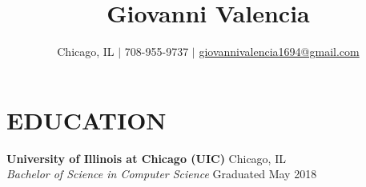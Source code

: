 \documentclass[10.99pt]{article}
\title{\vspace{-3.5em}\textbf{Giovanni Valencia}\vspace{-0.5em}}
\author{Chicago, IL $\mid$ 708-955-9737 $\mid$ \href{mailto:giovannivalencia1694@gmail.com}{giovannivalencia1694@gmail.com}}
\date{\vspace{-2em}}
\begin{document}
\maketitle

\vspace{-0.5em}
\section*{\textbf{EDUCATION}}
\noindent\makebox[\linewidth]{\rule{7.2in}{0.4pt}}
\textbf{University of Illinois at Chicago (UIC)} \hfill Chicago, IL
\\\textit{Bachelor of Science in Computer Science} \hfill Graduated May 2018

\vspace{-0.5em}
\end{document}
